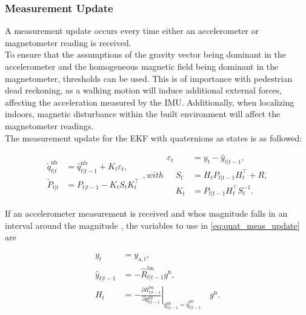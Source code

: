 \subsubsection{Measurement Update}

A measurement update occurs every time either an accelerometer or magnetometer reading is received. \\
To ensure that the assumptions of the gravity vector being dominant in the accelerometer and the homogeneous magnetic field being dominant in the magnetometer, thresholds can be used. This is of importance with pedestrian dead reckoning, as a walking motion will induce additional external forces, affecting the acceleration measured by the IMU. Additionally, when localizing indoors, magnetic disturbance within the built environment will affect the magnetometer readings.\\
The measurement update for the EKF with quaternions as states is as followed:

\begin{subequations}
	\begin{align}
	\tilde{q}_{t | t}^{\mathrm{nb}} &=\hat{q}_{t | t-1}^{\mathrm{nb}}+K_{t} \varepsilon_{t}, \\
	\tilde{P}_{t | t} &=P_{t | t-1}-K_{t} S_{t} K_{t}^{\top}
	\end{align},
	with	
	\begin{align}
	\varepsilon_{t} &= y_{t}-\hat{y}_{t | t-1},\\
	\quad S_{t} &= H_{t} P_{t | t-1} H_{t}^{\top}+R, \\
	\quad K_{t} &= P_{t | t-1} H_{t}^{\top} S_{t}^{-1}.
	\end{align}
\label{eq:quat_meas_update}	
\end{subequations}


If an accelerometer measurement is received and whos magnitude falls in an interval around the magnitude , the variables to use in \eqref{eq:quat_meas_update} are

\begin{subequations}
	\begin{align}
	y_{t}&=
	y_{\mathrm{a}, t}, \\
	\hat{y}_{t | t-1}&=
	-\hat{R}_{t | t-1}^{\mathrm{bn}} g^{\mathrm{n}},\\
	H_{t}&=	-\left.\frac{\partial R_{t | t-1}^{\mathrm{bn}}}{\partial q_{t | t-1}^{\mathrm{nb}}}\right|_{{q_{t | t-1}^{\mathrm{nb}}}=\hat{q}_{t | t-1}^{\mathrm{nb}}} \quad g^{\mathrm{n}}.
	\end{align}
\end{subequations}

